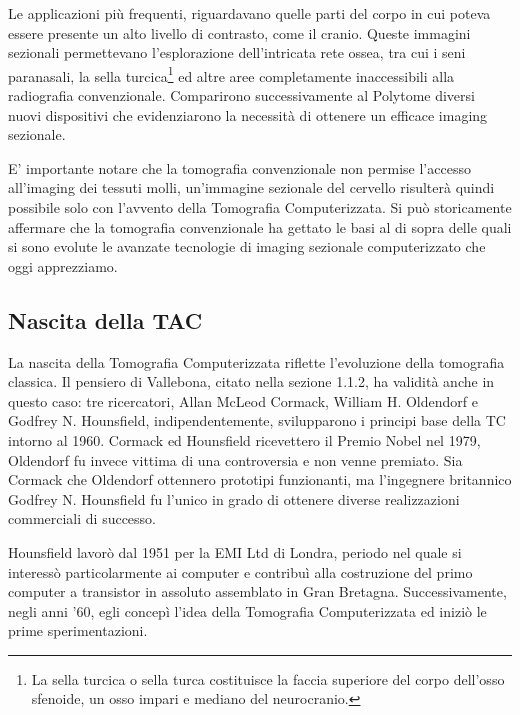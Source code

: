 \documentclass[a4paper,11pt, oneside]{article}
\begin{document}
                            
                    Le applicazioni più frequenti, riguardavano quelle parti del corpo in cui poteva essere presente un alto livello di contrasto, come il cranio. Queste immagini sezionali permettevano l’esplorazione dell’intricata rete ossea, tra cui i seni paranasali, la sella turcica\footnote{La sella turcica o sella turca costituisce la faccia superiore del corpo dell'osso sfenoide, un osso impari e mediano del neurocranio.} ed altre aree completamente inaccessibili alla radiografia convenzionale. Comparirono successivamente al Polytome diversi nuovi dispositivi che evidenziarono la necessità di ottenere un efficace imaging sezionale.
                \par
                    E’ importante notare che la tomografia convenzionale non permise l’accesso all’imaging dei tessuti molli, un’immagine sezionale del cervello risulterà quindi possibile solo con l’avvento della Tomografia Computerizzata. Si può storicamente affermare che la tomografia convenzionale ha gettato le basi al di sopra delle quali si sono evolute le avanzate tecnologie di imaging sezionale computerizzato che oggi apprezziamo.
                        
            \subsection{Nascita della TAC}
                \par      
                    La nascita della Tomografia Computerizzata riflette l'evoluzione della tomografia classica. Il pensiero di Vallebona, citato nella sezione 1.1.2, ha validità anche in questo caso: tre ricercatori, Allan McLeod Cormack, William H. Oldendorf e Godfrey N. Hounsfield, indipendentemente, svilupparono i principi base della TC intorno al 1960. Cormack ed Hounsfield ricevettero il Premio Nobel nel 1979, Oldendorf fu invece vittima di una controversia\cite{nobel-debate} e non venne premiato. 
                    Sia Cormack che Oldendorf ottennero prototipi funzionanti, ma l'ingegnere britannico Godfrey N. Hounsfield fu l'unico in grado di ottenere diverse realizzazioni commerciali di successo.
                \par
                    Hounsfield lavorò dal 1951 per la EMI Ltd di Londra, periodo nel quale si interessò particolarmente ai computer e contribuì alla costruzione del primo computer a transistor in assoluto assemblato in Gran Bretagna\cite{housfield-autobiografia}. Successivamente, negli anni '60, egli concepì l’idea della Tomografia Computerizzata ed iniziò le prime sperimentazioni.
                            
\end{document}
